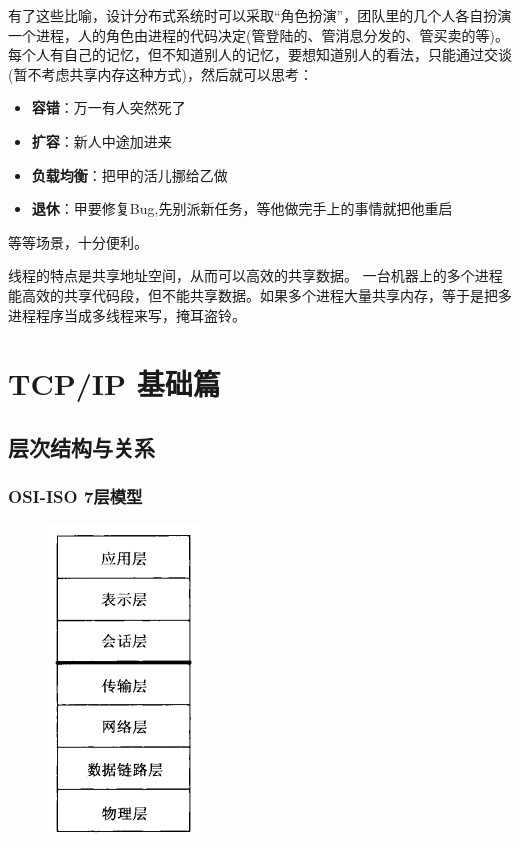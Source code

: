 \documentclass[UTF8,a4paper,8pt]{ctexbook}
\begin{document}
 	 有了这些比喻，设计分布式系统时可以采取“角色扮演”，团队里的几个人各自扮演一个进程，人的角色由进程的代码决定(管登陆的、管消息分发的、管买卖的等)。每个人有自己的记忆，但不知道别人的记忆，要想知道别人的看法，只能通过交谈(暂不考虑共享内存这种方式)，然后就可以思考：
 	 
	 	\begin{itemize}
		 	\item \textbf{容错}：万一有人突然死了
		 	\item \textbf{扩容}：新人中途加进来
		 	\item \textbf{负载均衡}：把甲的活儿挪给乙做
		 	\item \textbf{退休}：甲要修复Bug,先别派新任务，等他做完手上的事情就把他重启
	 	\end{itemize} 	
	 等等场景，十分便利。
	 
	 线程的特点是共享地址空间，从而可以高效的共享数据。 一台机器上的多个进程能高效的共享代码段，但不能共享数据。如果多个进程大量共享内存，等于是把多进程程序当成多线程来写，掩耳盗铃。		 	

\chapter{TCP/IP 基础篇}    

	\section{层次结构与关系}	
		\subsection{OSI-ISO 7层模型}
				\begin{figure}[h]
					\centering
					\includegraphics[scale = 0.8]{OSI-Model.png}
				\end{figure}
			
\end{document}
